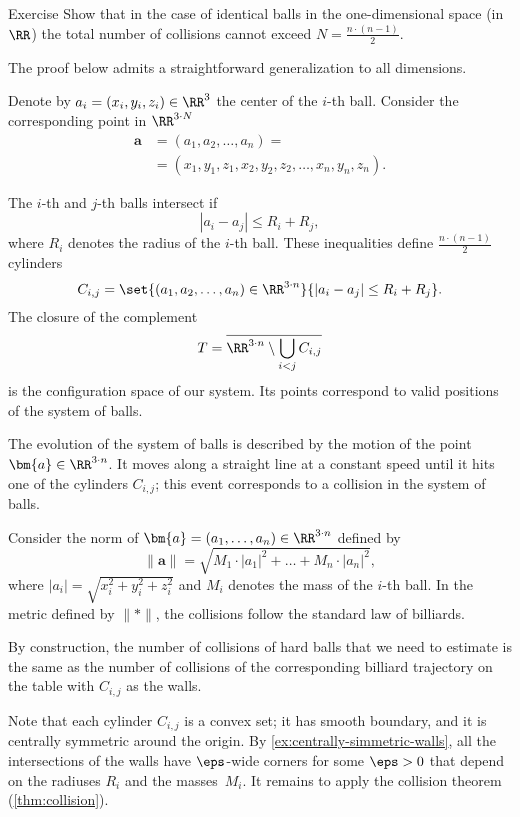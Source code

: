\begin{thm}{Exercise}\label{cor:balls:dim=1}
Show that in the case of identical balls in the one-dimensional space (in $\RR$) 
the total number of collisions cannot exceed $N=\tfrac{n\cdot(n-1)}2$.
\end{thm}



The proof below admits a straightforward generalization to all dimensions.

Denote by $a_i=(x_i,y_i,z_i) \in \RR^3$ the center of the $i$-th ball.
Consider the corresponding point in $\RR^{3\cdot N}$
\begin{align*}
\bm{a}&=(a_1, a_2 , \dots , a_n ) =
\\
&=(x_1, y_1 , z_1 , x_2 , y_2 , z_2 , \dots , x_n , y_n , z_n).
\end{align*}

The $i$-th and $j$-th balls intersect if 
$$|a_i - a_j | \le R_i+R_j,$$
where $R_i$ denotes the radius of the $i$-th ball.
These inequalities define $\tfrac{n\cdot(n-1)}{2}$ cylinders 
\[C_{i,j}=\set{(a_1, a_2 , \dots , a_n )\in\RR^{3\cdot n}} {|a_i - a_j |\le R_i+R_j}.\] 
The closure of the complement
\[T=\overline{\RR^{3\cdot n}\setminus \bigcup_{i< j} C_{i,j}}\] 
is the configuration space of our system. 
Its points correspond
to valid positions of the system of balls.

The evolution of the system
of balls is described by the motion of
the point $\bm{a}\in\RR^{3\cdot n}$.
It moves along a straight line at a
constant speed until it hits one of the cylinders $C_{i,j}$; 
this event corresponds
to a collision in the system of balls.

Consider the norm of $\bm{a}=(a_1,\dots,a_n)\in \RR^{3\cdot n}$ defined by
\[\lVert \bm{a}\rVert
=
\sqrt{M_1\cdot|a_1|^2+\dots+M_n\cdot |a_n|^2},\]
where $|a_i|=\sqrt{x_i^2+y_i^2+z_i^2}$ 
and $M_i$ denotes the mass of the $i$-th ball.
In the metric defined by $\lVert {*}\rVert$,
the collisions follow the
standard law of billiards. 

By construction, the number of collisions of hard balls that we need to estimate 
is the same as the number of collisions of the corresponding billiard trajectory on the table with $C_{i,j}$ as the walls.

Note that each cylinder $C_{i,j}$ is a convex set;
it has smooth boundary, 
and it is centrally symmetric around the origin.
By \ref{ex:centrally-simmetric-walls}, all the intersections of the walls have $\eps$-wide corners for some $\eps>0$ that depend on the radiuses $R_i$ and the masses~$M_i$.
It remains to apply the collision theorem (\ref{thm:collision}).
\qeds

